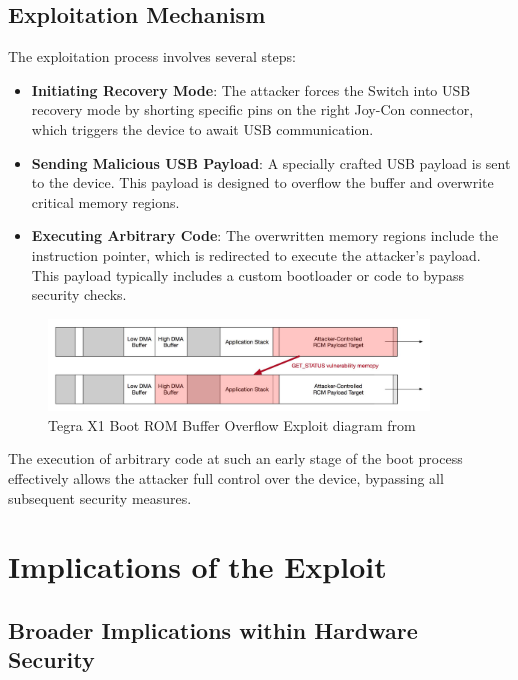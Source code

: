\subsection{Exploitation Mechanism}

The exploitation process involves several steps:

\begin{itemize}
    \item \textbf{Initiating Recovery Mode}: The attacker forces the Switch into USB recovery mode by shorting specific pins on the right Joy-Con connector, which triggers the device to await USB communication.
    \item \textbf{Sending Malicious USB Payload}: A specially crafted USB payload is sent to the device. This payload is designed to overflow the buffer and overwrite critical memory regions.
    \item \textbf{Executing Arbitrary Code}: The overwritten memory regions include the instruction pointer, which is redirected to execute the attacker's payload. This payload typically includes a custom bootloader or code to bypass security checks.
\end{itemize} 

\begin{figure}[H]
    \centering
    \includegraphics[width=0.9\textwidth]{images/overflow.png}
    \caption{Tegra X1 Boot ROM Buffer Overflow Exploit diagram from\cite{WaybackMachine2019}}
    \label{fig:fusee_gelee_exploit}
\end{figure}

The execution of arbitrary code at such an early stage of the boot process effectively allows the attacker full control over the device, bypassing all subsequent security measures\cite{WaybackMachine2019}.

\section{Implications of the Exploit}

\subsection{Broader Implications within Hardware Security}

